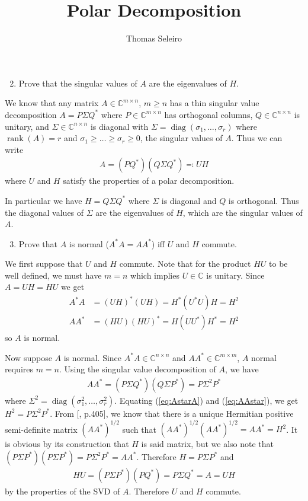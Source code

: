 \documentclass{article}
\DeclareMathOperator{\diag}{diag}
\DeclareMathOperator{\rank}{rank}
\begin{document}
\title{Polar Decomposition}
\author{Thomas Seleiro}
\maketitle


\begin{enumerate}
	\setcounter{enumi}{1}
	\item Prove that the singular values of $A$ are the eigenvalues of $H$.
\end{enumerate}

We know that any matrix $A\in\mathbb{C}^{m \times n}$, $m\geq n$ has 
a thin singular value decomposition $A = P \Sigma Q^*$ where $P \in
\mathbb{C}^{m \times n}$ has orthogonal columns, $Q \in 
\mathbb{C}^{n \times n}$ is unitary, and $\Sigma \in 
\mathbb{C}^{n \times n}$ is diagonal with $\Sigma = \diag(\sigma_1, 
\ldots, \sigma_r)$ where $\rank(A) = r$ and $\sigma_1 \geq \ldots \geq
\sigma_r \geq 0$, the singular values of $A$. Thus we can write
\begin{align}
	A = (PQ^*) (Q \Sigma Q^*) \eqqcolon UH
	\label{eq:PolarSVD}
\end{align}
where $U$ and $H$ satisfy the properties of a polar decomposition.

In particular we have $H = Q \Sigma Q^*$ where $\Sigma$ is diagonal and 
$Q$ is orthogonal. Thus the diagonal values of $\Sigma$ are the 
eigenvalues of $H$, which are the singular values of $A$.

\begin{enumerate}
	\setcounter{enumi}{2}
	\item Prove that $A$ is normal ($A^*A = AA^*$) iff $U$ and $H$
	commute.
\end{enumerate}

We first suppose that $U$ and $H$ commute. Note that for the product
$HU$ to be well defined, we must have $m = n$ which implies
$U\in\mathbb{C}$ is unitary. Since $A = UH = HU$ we get
\begin{align}
	\label{eq:AstarA}
	A^*A &= (UH)^* (UH) = H^*(U^*U)H = H^2 \\
	AA^* &= (HU) (HU)^* = H(UU^*)H^* = H^2
\end{align}
so $A$ is normal.

Now suppose $A$ is normal. Since $A^*A \in \mathbb{C}^{n\times n}$ and
$AA^* \in \mathbb{C}^{m \times m}$, $A$ normal requires $m=n$.
Using the singular value decomposition of $A$, we have
\begin{align}
	AA^* = (P\Sigma Q^*) (Q\Sigma P^*) = P\Sigma^2 P^*
	\label{eq:AAstar}
\end{align}
where $\Sigma^2 = \diag(\sigma_1^2, \ldots,\sigma_r^2)$.
Equating (\ref{eq:AstarA}) and (\ref{eq:AAstar}), we get 
$H^2 = P\Sigma^2P^*$. From [, p.405], we know that there
is a unique Hermitian positive semi-definite matrix $(AA^*)^{1/2}$ such 
that $(AA^*)^{1/2}(AA^*)^{1/2} = AA^* = H^2$.
It is obvious by its construction that $H$ is said matrix, but we also
note that $(P\Sigma P^*) (P\Sigma P^*) = P \Sigma^2P^* = AA^*$.
Therefore $H = P\Sigma P^*$ and
\begin{align}
	HU = (P\Sigma P^*) (PQ^*) = P \Sigma Q^* = A = UH
\end{align}
by the properties of the SVD of $A$. Therefore $U$ and $H$ commute.
 
\end{document}
